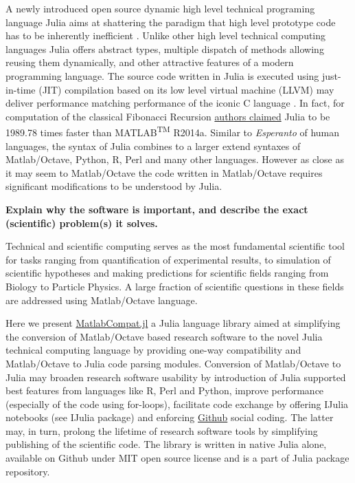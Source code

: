A newly introduced open source dynamic high level technical programing language Julia aims at shattering the paradigm that high level prototype code has to be inherently inefficient \cite{bezanson2012julia, bezanson2014julia}.  Unlike other high level technical computing languages Julia offers abstract types, multiple dispatch of methods allowing reusing them dynamically, and other attractive features of a modern programming language. The source code written in Julia is executed using just-in-time (JIT) compilation based on its low level virtual machine (LLVM) may deliver performance matching performance of the iconic C language \cite{bezanson2012julia, bezanson2014julia}. In fact, for computation of the classical Fibonacci Recursion \href{http://julialang.org/benchmarks/}{authors claimed} Julia to be 1989.78 times faster than MATLAB\textsuperscript{TM} R2014a. Similar to \textit{Esperanto} of human languages, the syntax of Julia combines to a larger extend syntaxes of Matlab/Octave, Python, R, Perl and many other languages. However as close as it may seem to Matlab/Octave the code written in Matlab/Octave requires significant modifications to be understood by Julia.

\textbf{Explain why the software is important, and describe the exact (scientific) problem(s) it solves.}

Technical and scientific computing serves as the most fundamental scientific tool for tasks ranging from quantification of experimental results, to simulation of scientific hypotheses and making predictions for scientific fields ranging from Biology to Particle Physics. A large fraction of scientific questions in these fields are addressed using Matlab/Octave language.

Here we present \href{https://github.com/MatlabCompat/MatlabCompat.jl}{MatlabCompat.jl} a Julia language library aimed at simplifying the conversion of Matlab/Octave based research software to the novel Julia technical computing language by providing one-way compatibility and Matlab/Octave to Julia code parsing modules. Conversion of Matlab/Octave to Julia may broaden research software usability by introduction of Julia supported best features from languages like R, Perl and Python, improve performance (especially of the code using for-loops), facilitate code exchange by offering IJulia notebooks (see IJulia package) and enforcing \href{http://github.com}{Github} social coding. The latter may, in turn, prolong the lifetime of research software tools by simplifying publishing of the scientific code. The library is written in native Julia alone, available on Github under MIT open source license and is a part of Julia package repository.

